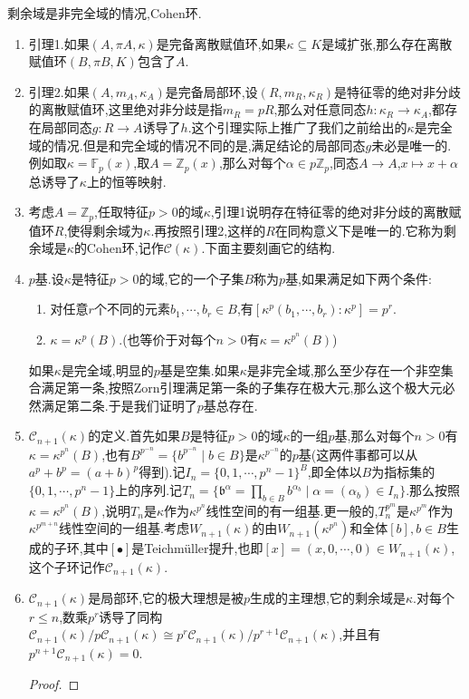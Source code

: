 剩余域是非完全域的情况,Cohen环.
\begin{enumerate}
	\item 引理1.如果$(A,\pi A,\kappa)$是完备离散赋值环,如果$\kappa\subseteq K$是域扩张,那么存在离散赋值环$(B,\pi B,K)$包含了$A$.
	\item 引理2.如果$(A,m_A,\kappa_A)$是完备局部环,设$(R,m_R,\kappa_R)$是特征零的绝对非分歧的离散赋值环,这里绝对非分歧是指$m_R=pR$,那么对任意同态$h:\kappa_R\to\kappa_A$,都存在局部同态$g:R\to A$诱导了$h$.这个引理实际上推广了我们之前给出的$\kappa$是完全域的情况.但是和完全域的情况不同的是,满足结论的局部同态$g$未必是唯一的.例如取$\kappa=\mathbb{F}_p(x)$,取$A=\mathbb{Z}_p(x)$,那么对每个$\alpha\in p\mathbb{Z}_p$,同态$A\to A$,$x\mapsto x+\alpha$总诱导了$\kappa$上的恒等映射.
	\item 考虑$A=\mathbb{Z}_p$,任取特征$p>0$的域$\kappa$,引理1说明存在特征零的绝对非分歧的离散赋值环$R$,使得剩余域为$\kappa$.再按照引理2,这样的$R$在同构意义下是唯一的.它称为剩余域是$\kappa$的Cohen环,记作$\mathcal{C}(\kappa)$.下面主要刻画它的结构.
	\item $p$基.设$\kappa$是特征$p>0$的域,它的一个子集$B$称为$p$基,如果满足如下两个条件:
	\begin{enumerate}
		\item 对任意$r$个不同的元素$b_1,\cdots,b_r\in B$,有$[\kappa^p(b_1,\cdots,b_r):\kappa^p]=p^r$.
		\item $\kappa=\kappa^p(B)$.(也等价于对每个$n>0$有$\kappa=\kappa^{p^n}(B)$)
	\end{enumerate}

    如果$\kappa$是完全域,明显的$p$基是空集.如果$\kappa$是非完全域,那么至少存在一个非空集合满足第一条,按照Zorn引理满足第一条的子集存在极大元,那么这个极大元必然满足第二条.于是我们证明了$p$基总存在.
    \item $\mathcal{C}_{n+1}(\kappa)$的定义.首先如果$B$是特征$p>0$的域$\kappa$的一组$p$基,那么对每个$n>0$有$\kappa=\kappa^{p^n}(B)$,也有$B^{p^{-n}}=\{b^{p^{-n}}\mid b\in B\}$是$\kappa^{p^{-n}}$的$p$基(这两件事都可以从$a^p+b^p=(a+b)^p$得到).记$I_n=\{0,1,\cdots,p^n-1\}^B$,即全体以$B$为指标集的$\{0,1,\cdots,p^n-1\}$上的序列.记$T_n=\{\mathfrak{b}^{\alpha}=\prod_{b\in B}b^{\alpha_b}\mid\alpha=(\alpha_b)\in I_n\}$.那么按照$\kappa=\kappa^{p^n}(B)$,说明$T_n$是$\kappa$作为$\kappa^{p^n}$线性空间的有一组基.更一般的,$T_n^{p^m}$是$\kappa^{p^m}$作为$\kappa^{p^{m+n}}$线性空间的一组基.考虑$W_{n+1}(\kappa)$的由$W_{n+1}(\kappa^{p^n})$和全体$[b],b\in B$生成的子环,其中$[\bullet]$是Teichm\"uller提升,也即$[x]=(x,0,\cdots,0)\in W_{n+1}(\kappa)$,这个子环记作$\mathcal{C}_{n+1}(\kappa)$.
    \item $\mathcal{C}_{n+1}(\kappa)$是局部环,它的极大理想是被$p$生成的主理想,它的剩余域是$\kappa$.对每个$r\le n$,数乘$p^r$诱导了同构$\mathcal{C}_{n+1}(\kappa)/p\mathcal{C}_{n+1}(\kappa)\cong p^r\mathcal{C}_{n+1}(\kappa)/p^{r+1}\mathcal{C}_{n+1}(\kappa)$,并且有$p^{n+1}\mathcal{C}_{n+1}(\kappa)=0$.
    \begin{proof}
    	

\end{proof}
\end{enumerate}
